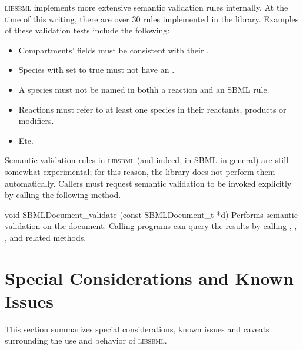 \documentclass{sbmlmanual}
\newcommand{\libsbml}{\textsc{libsbml}}
\begin{document}
\libsbml{} implements more extensive semantic validation rules internally.
At the time of this writing, there are over 30 rules implemented in the
library.  Examples of these validation tests include the following:

\begin{itemize}\setlength{\parskip}{-0.25ex}
  
\item Compartments'  fields must be consistent with
  their .
  
\item Species with  set to true must not have
  an .
  
\item A species must not be named in bothh a reaction and an SBML rule.
  
\item Reactions must refer to at least one species in their
  reactants, products or modifiers.

\item Etc.

\end{itemize}
    
Semantic validation rules in \libsbml{} (and indeed, in SBML in general)
are still somewhat experimental; for this reason, the library does not
perform them automatically.  Callers must request semantic validation to be
invoked explicitly by calling the following method.


\begin{methoddef}{void SBMLDocument\_validate (const SBMLDocument\_t *d)}
  Performs semantic validation on the document.  Calling programs can query
  the results by calling ,
  ,
  , and related methods.
\end{methoddef}




\section{Special Considerations and Known Issues}
\label{sec:special-considerations}

This section summarizes special considerations, known issues and caveats
surrounding the use and behavior of \libsbml{}.
\end{document}
